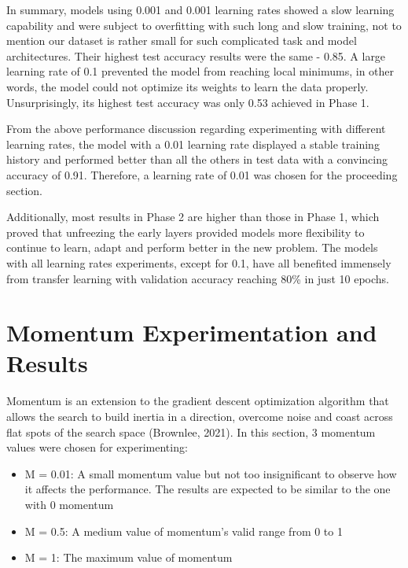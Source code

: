 \documentclass[]{article}
\begin{document}
In summary, models using 0.001 and 0.001 learning rates showed a slow learning capability and were subject to overfitting with such long and slow training, not to mention our dataset is rather small for such complicated task and model architectures. Their highest test accuracy results were the same - 0.85. A large learning rate of 0.1 prevented the model from reaching local minimums, in other words, the model could not optimize its weights to learn the data properly. Unsurprisingly, its highest test accuracy was only 0.53 achieved in Phase 1.  

From the above performance discussion regarding experimenting with different learning rates, the model with a 0.01 learning rate displayed a stable training history and performed better than all the others in test data with a convincing accuracy of 0.91. Therefore, a learning rate of 0.01 was chosen for the proceeding section.  

Additionally, most results in Phase 2 are higher than those in Phase 1, which proved that unfreezing the early layers provided models more flexibility to continue to learn, adapt and perform better in the new problem. The models with all learning rates experiments, except for 0.1, have all benefited immensely from transfer learning with validation accuracy reaching 80\% in just 10 epochs.  


\section{Momentum Experimentation and Results} \label{momentum_section}

Momentum is an extension to the gradient descent optimization algorithm that allows the search to build inertia in a direction, overcome noise and coast across flat spots of the search space (Brownlee, 2021). In this section, 3 momentum values were chosen for experimenting: 

    \begin{itemize}
        \item M = 0.01: A small momentum value but not too insignificant to observe how it affects the performance. The results are expected to be similar to the one with 0 momentum
        \item M = 0.5: A medium value of momentum's valid range from 0 to 1  
        \item M = 1: The maximum value of momentum 
    \end{itemize}
\end{document}
